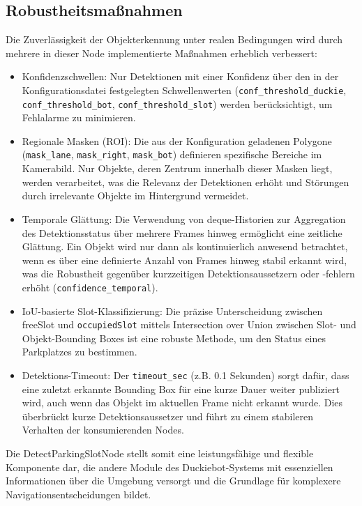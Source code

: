\subsection{Robustheitsmaßnahmen}
Die Zuverlässigkeit der Objekterkennung unter realen Bedingungen wird durch mehrere in dieser Node implementierte Maßnahmen erheblich verbessert:
\begin{itemize}
    \item Konfidenzschwellen: Nur Detektionen mit einer Konfidenz über den in der Konfigurationsdatei festgelegten Schwellenwerten (\texttt{conf\_threshold\_duckie}, \texttt{conf\_threshold\_bot}, \texttt{conf\_threshold\_slot}) werden berücksichtigt, um Fehlalarme zu minimieren.
    \item Regionale Masken (\ac{ROI}): Die aus der Konfiguration geladenen Polygone (\texttt{mask\_lane}, \texttt{mask\_right}, \texttt{mask\_bot}) definieren spezifische Bereiche im Kamerabild. Nur Objekte, deren Zentrum innerhalb dieser Masken liegt, werden verarbeitet, was die Relevanz der Detektionen erhöht und Störungen durch irrelevante Objekte im Hintergrund vermeidet.
    \item Temporale Glättung: Die Verwendung von deque-Historien zur Aggregation des Detektionsstatus über mehrere Frames hinweg ermöglicht eine zeitliche Glättung. Ein Objekt wird nur dann als kontinuierlich anwesend betrachtet, wenn es über eine definierte Anzahl von Frames hinweg stabil erkannt wird, was die Robustheit gegenüber kurzzeitigen Detektionsaussetzern oder -fehlern erhöht (\texttt{confidence\_temporal}).
    \newpage
    \item \ac{IoU}-basierte Slot-Klassifizierung: Die präzise Unterscheidung zwischen freeSlot und \texttt{occupiedSlot} mittels Intersection over Union zwischen Slot- und Objekt-Bounding Boxes ist eine robuste Methode, um den Status eines Parkplatzes zu bestimmen.
    \item Detektions-Timeout: Der \texttt{timeout\_sec} (z.B. 0.1 Sekunden) sorgt dafür, dass eine zuletzt erkannte Bounding Box für eine kurze Dauer weiter publiziert wird, auch wenn das Objekt im aktuellen Frame nicht erkannt wurde. Dies überbrückt kurze Detektionsaussetzer und führt zu einem stabileren Verhalten der konsumierenden Nodes.
\end{itemize}

Die DetectParkingSlotNode stellt somit eine leistungsfähige und flexible Komponente dar, die andere Module des Duckiebot-Systems mit essenziellen Informationen über die Umgebung versorgt und die Grundlage für komplexere Navigationsentscheidungen bildet.